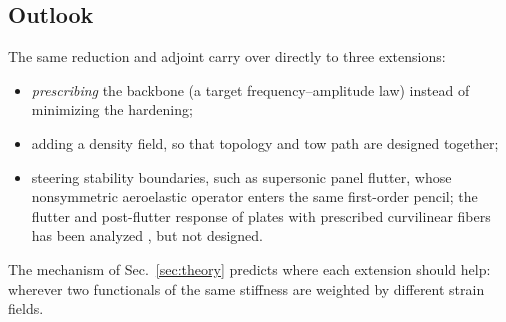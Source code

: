 \subsection{Outlook}
The same reduction and adjoint carry over directly to three extensions:
\begin{itemize}[itemsep=1pt]
\item \emph{prescribing} the backbone (a target frequency--amplitude law) instead of
  minimizing the hardening;
\item adding a density field, so that topology and tow path are designed together;
\item steering stability boundaries, such as supersonic panel flutter, whose
  nonsymmetric aeroelastic operator enters the same first-order pencil; the flutter and
  post-flutter response of plates with prescribed curvilinear fibers has been analyzed
  \cite{akhavan2018,akhavan2020,farsadi2019}, but not designed.
\end{itemize}
The mechanism of Sec.~\ref{sec:theory} predicts where each extension should help: wherever
two functionals of the same stiffness are weighted by different strain fields.


